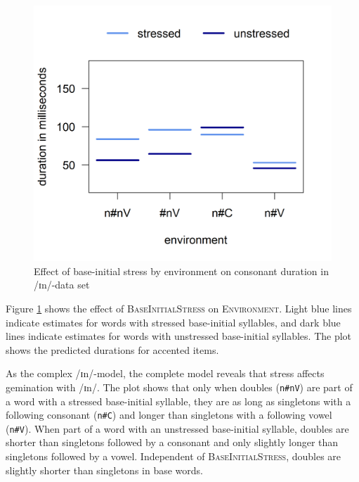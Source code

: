 	\begin{figure}[b!]
		\centering
				\vspace*{-0.35cm}
		\includegraphics [scale=0.5] {images/Experiment/InModelCompleteInterEnvStress}
		
		\caption{Effect of base-initial stress by environment on consonant duration in /ɪn/-data set}	
		\label{fig:Env Stress In complete experiment}
	\end{figure}%








Figure \ref{fig:Env Stress In complete experiment} shows the effect of \textsc{BaseInitialStress} on \textsc{Environment}. Light blue lines indicate estimates for words with stressed base-initial syllables, and dark blue lines indicate estimates for words with unstressed base-initial syllables. The plot shows the predicted durations for accented items.



As the complex /ɪn/-model, the complete model reveals that stress affects gemination with /ɪn/. 
The plot shows that only when doubles (\texttt{n\#nV}) are part of a word with a stressed base-initial syllable, they are as long as singletons with a following consonant  (\texttt{n\#C}) and longer than singletons with a following vowel  (\texttt{n\#V}). When part of a word with an unstressed base-initial syllable, doubles are shorter than singletons followed by a consonant and only slightly longer than singletons followed by a vowel. Independent of \textsc{BaseInitialStress}, doubles are slightly shorter than singletons in base words.




